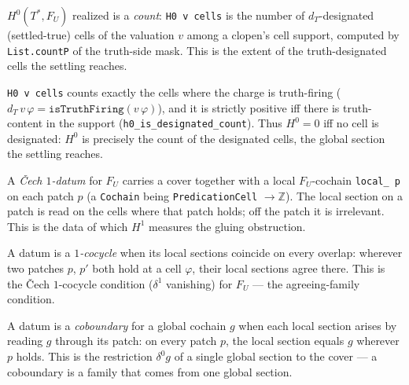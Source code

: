 \begin{proposition}\label{thm:h0-count}\leanok{}
$H^0(T^*, F_U)$ realized is a \emph{count}: \texttt{H0 v cells} is the number of $d_T$-designated (settled-true) cells of the valuation $v$ among a clopen's cell support, computed by \texttt{List.countP} of the truth-side mask. This is the extent of the truth-designated cells the settling reaches.
\end{proposition}
\begin{theorem}\label{thm:settling-cohomology-h1-vanishes}\leanok{}
\texttt{H0 v cells} counts exactly the cells where the charge is truth-firing ($d_T\,v\,\varphi = \texttt{isTruthFiring}(v\,\varphi)$), and it is strictly positive iff there is truth-content in the support (\texttt{h0\_is\_designated\_count}). Thus $H^0 = 0$ iff no cell is designated: $H^0$ is precisely the count of the designated cells, the global section the settling reaches.
\end{theorem}
\begin{proposition}\label{thm:cech1}\leanok{}
A \emph{\v{C}ech $1$-datum} for $F_U$ carries a cover together with a local $F_U$-cochain \texttt{local\_ p} on each patch $p$ (a \texttt{Cochain} being \texttt{PredicationCell} $\to \mathbb{Z}$). The local section on a patch is read on the cells where that patch holds; off the patch it is irrelevant. This is the data of which $H^1$ measures the gluing obstruction.
\end{proposition}
\begin{proposition}\label{thm:cocycle}\leanok{}
A datum is a \emph{$1$-cocycle} when its local sections coincide on every overlap: wherever two patches $p$, $p'$ both hold at a cell $\varphi$, their local sections agree there. This is the \v{C}ech $1$-cocycle condition ($\delta^1$ vanishing) for $F_U$ --- the agreeing-family condition.
\end{proposition}
\begin{proposition}[Coboundary]\label{thm:coboundary}\leanok{}
A datum is a \emph{coboundary} for a global cochain $g$ when each local section arises by reading $g$ through its patch: on every patch $p$, the local section equals $g$ wherever $p$ holds. This is the restriction $\delta^0 g$ of a single global section to the cover --- a coboundary is a family that comes from one global section.
\end{proposition}
